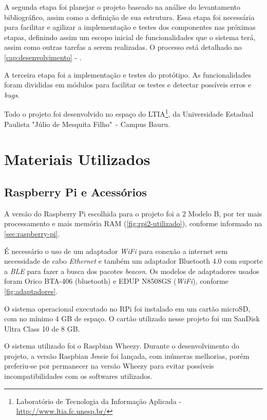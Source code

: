 \documentclass[
		12pt,				%
		openright,			%
		oneside,			%
		a4paper,			%
		chapter=TITLE,		%
		english,			%
		brazil				%
	]{abntex2}
\begin{document}
A segunda etapa foi planejar o projeto baseado na análise do levantamento bibliográfico, assim como a definição de sua estrutura. Essa etapa foi necessária para facilitar e agilizar a implementação e testes dos componentes nas próximas etapas, definindo assim um escopo inicial de funcionalidades que o sistema terá, assim como outras tarefas a serem realizadas. O processo está detalhado no \autoref{cap:desenvolvimento} - .

A terceira etapa foi a implementação e testes do protótipo. As funcionalidades foram divididas em módulos para facilitar os testes e detectar possíveis erros e \textit{bugs}.

Todo o projeto foi desenvolvido no espaço do LTIA\footnote{Laboratório de Tecnologia da Informação Aplicada - \url{http://www.ltia.fc.unesp.br/}}, da Universidade Estadual Paulista "Júlio de Mesquita Filho"\ - Campus Bauru.


\section{Materiais Utilizados}\label{sec:materiais-utilizados}

\subsection{Raspberry Pi e Acessórios}\label{sec:rpi-acessorios}

A versão do Raspberry Pi escolhida para o projeto foi a 2 Modelo B, por ter mais processamento e mais memória RAM (\autoref{fig:rpi2-utilizado}), conforme informado na \autoref{sec:raspberry-pi}.

É necessário o uso de um adaptador \textit{WiFi} para conexão a internet sem necessidade de cabo \textit{Ethernet} e também um adaptador Bluetooth 4.0 com suporte a \textit{BLE} para fazer a busca dos pacotes \textit{beacon}. Os modelos de adaptadores usados foram Orico BTA-406 (bluetooth) e EDUP N8508GS (\textit{WiFi}), conforme \autoref{fig:adaptadores}.

O sistema operacional executado no RPi foi instalado em um cartão microSD, com no mínimo 4 GB de espaço. O cartão utilizado nesse projeto foi um SanDisk Ultra Class 10 de 8 GB. 

O sistema utilizado foi o Raspbian Wheezy. Durante o desenvolvimento do projeto, a versão Raspbian Jessie foi lançada, com inúmeras melhorias, porém preferiu-se por permanecer na versão Wheezy para evitar possíveis incompatibilidades com os softwares utilizados.
\end{document}
